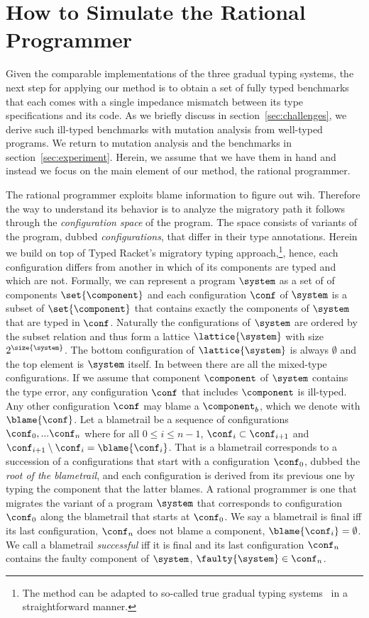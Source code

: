 \section{How to Simulate the Rational Programmer} \label{sec:ideas}

Given the comparable implementations of the three gradual typing systems,
the next step for applying our method is to obtain a set of fully
typed benchmarks that each comes with a single impedance mismatch between
its type specifications and its code. As we briefly discuss in
section~\ref{sec:challenges}, we derive such ill-typed benchmarks with
mutation analysis from well-typed programs.  We return to mutation
analysis and the benchmarks in section~\ref{sec:experiment}.  Herein,
we assume that we have them in hand and instead we focus on the
main element of our method, the rational programmer.  


The rational programmer exploits blame information to figure out wih. Therefore the way to understand its behavior 
is to analyze the migratory path it follows through the 
\emph{configuration space} of the program. The space
consists of variants of the program, dubbed \emph{configurations}, that 
differ in their type annotations. 
Herein we build on top of Typed Racket's migratory typing
approach,\footnote{The method can be adapted to so-called true gradual typing
systems~\cite{svcb-snapl-2015} in a straightforward manner.}, hence, each configuration differs from another
in which of its components are typed and which are not. Formally, we can
represent a program $\system$ as a set of of components
$\set{\component}$ and each configuration $\conf$ of $\system$ is a subset of 
$\set{\component}$
that contains exactly the components of  $\system$ that are typed in
$\conf$. Naturally the configurations of  $\system$ are ordered by the subset relation and
thus form a lattice $\lattice{\system}$ with size $2^{\size{\system}}$.
The bottom configuration of $\lattice{\system}$ is always $\emptyset$ and
the top element is $\system$ itself. In between there are all the
mixed-type configurations. If we assume that  component $\component$ of $\system$
contains the type error, any configuration $\conf$ that
includes $\component$ is ill-typed. Any other configuration $\conf$ may blame 
a $\component_b$, which we denote with $\blame{\conf}$. Let a blametrail
be a sequence of configurations $\conf_0,...\conf_n$ where 
for all $0 \leq i \leq n - 1$, $\conf_i \subset \conf_{i+1}$ and
$\conf_{i+1} \setminus \conf_i = \blame{\conf_i}$. That is a blametrail
corresponds to a succession of a configurations that start with a
configuration $\conf_0$, dubbed the \emph{root of the blametrail}, and 
each configuration is derived from its previous one by typing the
component that the latter blames. A rational programmer is one that
migrates the variant of a program $\system$ that corresponds to
configuration $\conf_0$ along the blametrail that starts at $\conf_0$.
We say a blametrail is final iff its last configuration, $\conf_n$
does not blame a component, $\blame{\conf_i} = \emptyset$. We call a
blametrail \emph{successful} iff it is final and its last configuration
$\conf_n$ contains the faulty component of $\system$, $\faulty{\system}
\in \conf_n$. 

